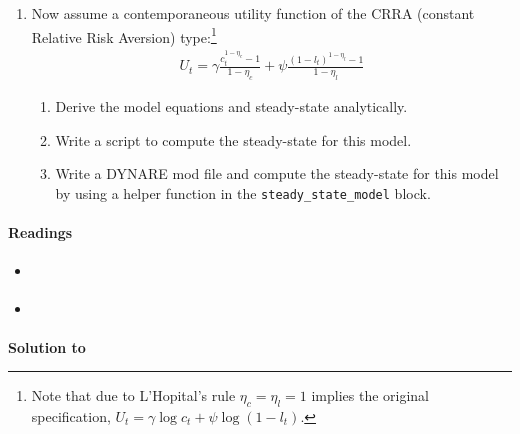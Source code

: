 \begin{enumerate}
\item Now assume a contemporaneous utility function of the CRRA (constant Relative Risk Aversion) type:\footnote{%
  Note that due to {L'Hopital}'s rule \(\eta_c=\eta_l=1\) implies the original specification, \(U_t=\gamma \log c_t + \psi \log(1-l_t)\).
}
\begin{align*}
U_t = \gamma \frac{c_{t}^{1-\eta_c}-1}{1-\eta_c} + \psi \frac{{(1-l_{t})}^{1-\eta_l}-1}{1-\eta_l}
\end{align*}
\begin{enumerate}
\item Derive the model equations and steady-state analytically.
\item Write a script to compute the steady-state for this model.
\item Write a DYNARE mod file and compute the steady-state for this model by using a helper function in the \texttt{steady\_state\_model} block.
\end{enumerate}

\end{enumerate}

\paragraph{Readings}
\begin{itemize}
\item \textcite[Ch.~3, Ch.~6]{McCandless_2008_ABCsRBCsIntroduction}
\item \textcite[Ch.~1, Ch.~2]{Torres_2013_IntroductionDynamicMacroeconomic}
\end{itemize}

\begin{solution}\textbf{Solution to }
\ifDisplaySolutions%

\fi
\newpage
\end{solution}